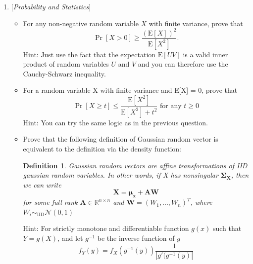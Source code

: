 \documentclass[10pt]{article}
\newtheorem{definition}{Definition}
\begin{document}
\begin{enumerate}
\item{} {[}\textit{Probability and Statistics}{]}
\begin{itemize}
\item[(a)] For any non-negative random variable $X$ with finite variance, prove that
     \[\Pr[X>0]\geq \frac{(\textrm{E}[X])^2}{\textrm{E}[X^2]}.\]
Hint: Just use the fact that the expectation \(\mathrm{E}[UV]\) is a valid inner product of random variables \(U\) and \(V\) and you can therefore use the Cauchy-Schwarz inequality.
\item[(b)] For a random variable X with finite variance and E[X] = 0, prove that
     \[\Pr[X\geq t]\leq \frac{\textrm{E}[X^2]}{\textrm{E}[X^2]+t^2}\text{ for any }t\geq 0\]
     Hint: You can try the same logic as in the previous question.
\item[(c)] Prove that the following definition of Gaussian random vector is equivalent to the definition via the density function:
\begin{definition}\label{gaussian-as-affine-map}
    Gaussian random vectors are affine transformations of IID gaussian random variables. In other words, if X has nonsingular $\mathbf{\Sigma_X}$, then we can write
\[\mathbf{X = \mu_x +AW}\]for some full rank \(\mathbf A\in\mathbb{R}^{n\times n}\) and \(\mathbf W = (W_1,..., W_n)^T\), where \(W_i\sim_{\mathrm{IID}}\mathcal{N} (0, 1)\) 
\end{definition}
Hint: For strictly monotone and differentiable function $g(x)$ such that $Y=g(X)$, and let \(g^{-1}\) be the inverse function of \(g\)\[f_Y(y)=f_X(g^{-1}(y))\frac{1}{|g'(g^{-1}(y)|}\]
\end{itemize}
\newpage{}




\end{enumerate}
\end{document}
